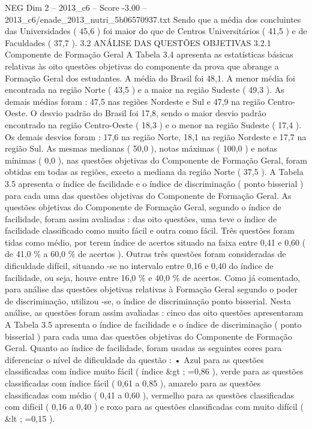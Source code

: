 \begin{textsample}{NEG Dim 2 – 2013\_c6 – Score -3.00 – 2013\_c6/enade\_2013\_nutri\_5b06570937.txt}
Sendo que a média dos concluintes das Universidades ( 45,6 ) foi maior do que de Centros Universitários ( 41,5 ) e de Faculdades ( 37,7 ). 3.2 ANÁLISE DAS QUESTÕES OBJETIVAS 3.2.1 Componente de Formação Geral A Tabela 3.4 apresenta as estatísticas básicas relativas às oito questões objetivas do componente da prova que abrange a Formação Geral dos estudantes.
A média do Brasil foi 48,1.
A menor média foi encontrada na região Norte ( 43,5 ) e a maior na região Sudeste ( 49,3 ).
As demais médias foram : 47,5 nas regiões Nordeste e Sul e 47,9 na região Centro-Oeste.
O desvio padrão do Brasil foi 17,8, sendo o maior desvio padrão encontrado na região Centro-Oeste ( 18,3 ) e o menor na região Sudeste ( 17,4 ).
Os demais desvios foram : 17,6 na região Norte, 18,1 na região Nordeste e 17,7 na região Sul.
As mesmas medianas ( 50,0 ), notas máximas ( 100,0 ) e notas mínimas ( 0,0 ), nas questões objetivas do Componente de Formação Geral, foram obtidas em todas as regiões, exceto a mediana da região Norte ( 37,5 ).
A Tabela 3.5 apresenta o índice de facilidade e o índice de discriminação ( ponto bisserial ) para cada uma das questões objetivas do Componente de Formação Geral.
As questões objetivas do Componente de Formação Geral, segundo o índice de facilidade, foram assim avaliadas : das oito questões, uma teve o índice de facilidade classificado como muito fácil e outra como fácil.
Três questões foram tidas como médio, por terem índice de acertos situado na faixa entre 0,41 e 0,60 ( de 41,0 \% a 60,0 \% de acertos ).
Outras três questões foram consideradas de dificuldade difícil, situando -se no intervalo entre 0,16 e 0,40 do índice de facilidade, ou seja, houve entre 16,0 \% e 40,0 \% de acertos.
Como já comentado, para análise das questões objetivas relativas à Formação Geral segundo o poder de discriminação, utilizou -se, o índice de discriminação ponto bisserial.
Nesta análise, as questões foram assim avaliadas : cinco das oito questões apresentaram A Tabela 3.5 apresenta o índice de facilidade e o índice de discriminação ( ponto bisserial ) para cada uma das questões objetivas do Componente de Formação Geral.
Quanto ao índice de facilidade, foram usadas as seguintes cores para diferenciar o nível de dificuldade da questão : • Azul para as questões classificadas com índice muito fácil ( índice \&gt ; =0,86 ), verde para as questões classificadas com índice fácil ( 0,61 a 0,85 ), amarelo para as questões classificadas com médio ( 0,41 a 0,60 ), vermelho para as questões classificadas com difícil ( 0,16 a 0,40 ) e roxo para as questões classificadas com muito difícil ( \&lt ; =0,15 ).

\end{textsample}
